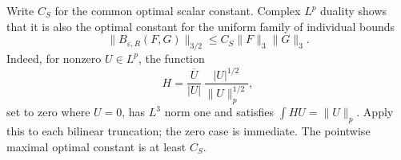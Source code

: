 Write $C_S$ for the common optimal scalar constant.  Complex $L^p$
duality shows that it is also the optimal constant for the uniform
family of individual bounds
\[
 \|B_{\varepsilon,R}(F,G)\|_{3/2}
 \le C_S\|F\|_3\|G\|_3.
\]
Indeed, for nonzero $U\in L^p$, the function
\[
 H=\frac{\overline U}{|U|}\,
       \frac{|U|^{1/2}}{\|U\|_p^{1/2}},
\]
set to zero where $U=0$, has $L^3$ norm one and satisfies
$\int HU=\|U\|_p$.  Apply this to each bilinear truncation; the zero
case is immediate.  The pointwise maximal optimal constant is at least
$C_S$.
